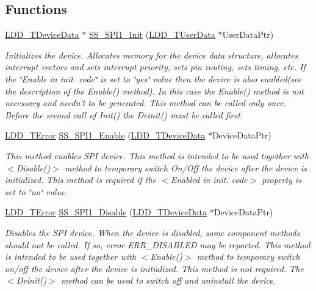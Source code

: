 \subsection*{Functions}
\begin{DoxyCompactItemize}
\item 
\hyperlink{group___p_e___types__module_gac5cf1362f1f0e3a2ce71b1bf2276d091}{L\-D\-D\-\_\-\-T\-Device\-Data} $\ast$ \hyperlink{group___s_s___s_p_i1__module_ga3fcbc65a28ef92bf7bb582ab1a44c492}{S\-S\-\_\-\-S\-P\-I1\-\_\-\-Init} (\hyperlink{group___p_e___types__module_ga0b66a73f87238a782318aa0be7578e35}{L\-D\-D\-\_\-\-T\-User\-Data} $\ast$User\-Data\-Ptr)
\begin{DoxyCompactList}\small\item\em Initializes the device. Allocates memory for the device data structure, allocates interrupt vectors and sets interrupt priority, sets pin routing, sets timing, etc. If the \char`\"{}\-Enable in init. code\char`\"{} is set to \char`\"{}yes\char`\"{} value then the device is also enabled(see the description of the Enable() method). In this case the Enable() method is not necessary and needn't to be generated. This method can be called only once. Before the second call of Init() the Deinit() must be called first. \end{DoxyCompactList}\item 
\hyperlink{group___p_e___types__module_ga24c2b045fd04e79e85f261ce4df35588}{L\-D\-D\-\_\-\-T\-Error} \hyperlink{group___s_s___s_p_i1__module_gaff0ae1b55915d6730a5670c42a4e2c95}{S\-S\-\_\-\-S\-P\-I1\-\_\-\-Enable} (\hyperlink{group___p_e___types__module_gac5cf1362f1f0e3a2ce71b1bf2276d091}{L\-D\-D\-\_\-\-T\-Device\-Data} $\ast$Device\-Data\-Ptr)
\begin{DoxyCompactList}\small\item\em This method enables S\-P\-I device. This method is intended to be used together with $<$Disable()$>$ method to temporary switch On/\-Off the device after the device is initialized. This method is required if the $<$Enabled in init. code$>$ property is set to \char`\"{}no\char`\"{} value. \end{DoxyCompactList}\item 
\hyperlink{group___p_e___types__module_ga24c2b045fd04e79e85f261ce4df35588}{L\-D\-D\-\_\-\-T\-Error} \hyperlink{group___s_s___s_p_i1__module_gaa1498d8d4293a6cb7230a4bc8b016a4f}{S\-S\-\_\-\-S\-P\-I1\-\_\-\-Disable} (\hyperlink{group___p_e___types__module_gac5cf1362f1f0e3a2ce71b1bf2276d091}{L\-D\-D\-\_\-\-T\-Device\-Data} $\ast$Device\-Data\-Ptr)
\begin{DoxyCompactList}\small\item\em Disables the S\-P\-I device. When the device is disabled, some component methods should not be called. If so, error E\-R\-R\-\_\-\-D\-I\-S\-A\-B\-L\-E\-D may be reported. This method is intended to be used together with $<$Enable()$>$ method to temporary switch on/off the device after the device is initialized. This method is not required. The $<$Deinit()$>$ method can be used to switch off and uninstall the device. \end{DoxyCompactList}\item 

\end{DoxyCompactItemize}
